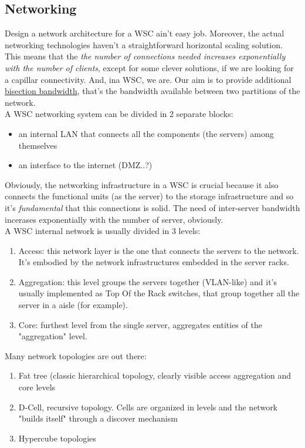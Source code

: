 \documentclass[10pt,a4paper]{article}
\begin{document}
			\subsection{Networking}
				Design a network architecture for a WSC ain't easy job. Moreover, the actual networking technologies haven't a straightforward horizontal scaling solution. This means that the \emph{the number of connections needed increases exponentially with the number of clients}, except for some clever solutions, if we are looking for a capillar connectivity. And, ina WSC, we are. Our aim is to provide additional \underline{bisection bandwidth}, that's the bandwidth available between two partitions of the network.\\ 
				A WSC networking system can be divided in 2 separate blocks:
				\begin{itemize}
					\item an internal LAN that connects all the components (the servers) among themselves
					\item an interface to the internet (DMZ..?)
				\end{itemize}
				
				Obviously, the networking infrastructure in a WSC is crucial because it also connects the functional units (as the server) to the storage infrastructure and so it's \emph{fundamental} that this connections is solid. The need of inter-server bandwidth incerases exponentially with the number of server, obviously.\\
				A WSC internal network is usually divided in 3 levels:
				\begin{enumerate}
					\item Access: this network layer is the one that connects the servers to the network. It's embodied by the network infrastructures embedded in the server racks.
					\item Aggregation: this level groups the servers together (VLAN-like) and it's usually implemented as Top Of the Rack switches, that group together all the server in a aisle (for example).
					\item Core: furthest level from the single server, aggregates entities of the "aggregation" level.
				\end{enumerate}
				Many network topologies are out there:
				\begin{enumerate}
					\item Fat tree (classic hierarchical topology, clearly visible access aggregation and core levels
					\item D-Cell, recursive topology. Cells are organized in levels and the network "builds itself" through a discover mechanism
					\item Hypercube topologies
				\end{enumerate}
				
\end{document}
